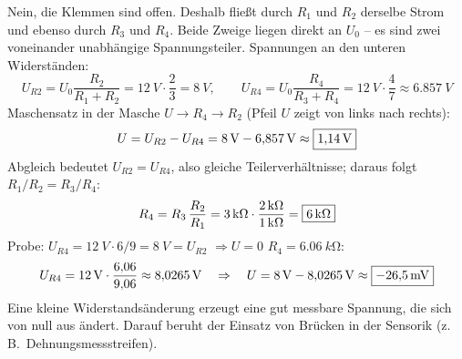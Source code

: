 \documentclass[11pt,a4paper]{article}
\begin{document}
\begin{loesung}
Nein, die Klemmen sind offen. Deshalb fließt durch $R_1$ und $R_2$ derselbe Strom und ebenso durch $R_3$ und $R_4$. Beide Zweige liegen direkt an $U_0$ -- es sind zwei voneinander unabhängige Spannungsteiler.
Spannungen an den unteren Widerständen:
\[
  U_{R2} = U_0\frac{R_2}{R_1+R_2} = \SI{12}{V}\cdot\frac{2}{3} = \SI{8}{V},\qquad
  U_{R4} = U_0\frac{R_4}{R_3+R_4} = \SI{12}{V}\cdot\frac{4}{7} \approx \SI{6.857}{V}
\]
Maschensatz in der Masche $U \to R_4 \to R_2$ (Pfeil $U$ zeigt von links nach rechts):
\[
  U = U_{R2}-U_{R4} = \SI{8}{V}-\SI{6.857}{V} \approx \boxed{\SI{1.14}{V}}
\]
Abgleich bedeutet $U_{R2} = U_{R4}$, also gleiche Teilerverhältnisse; daraus folgt $R_1/R_2 = R_3/R_4$:
\[
  R_4 = R_3\,\frac{R_2}{R_1} = \SI{3}{k\ohm}\cdot\frac{\SI{2}{k\ohm}}{\SI{1}{k\ohm}} = \boxed{\SI{6}{k\ohm}}
\]
Probe: $U_{R4} = \SI{12}{V}\cdot 6/9 = \SI{8}{V} = U_{R2}$ $\Rightarrow U = 0$ \checkmark
{}
$R_4 = \SI{6.06}{k\ohm}$:
\[
  U_{R4} = \SI{12}{V}\cdot\frac{6{,}06}{9{,}06} \approx \SI{8.0265}{V}\quad\Rightarrow\quad
  U = \SI{8}{V}-\SI{8.0265}{V} \approx \boxed{\SI{-26.5}{mV}}
\]
Eine kleine Widerstandsänderung erzeugt eine gut messbare Spannung, die sich von null aus ändert. Darauf beruht der Einsatz von Brücken in der Sensorik (z.\,B.\ Dehnungsmessstreifen).
\end{loesung}
\end{document}
